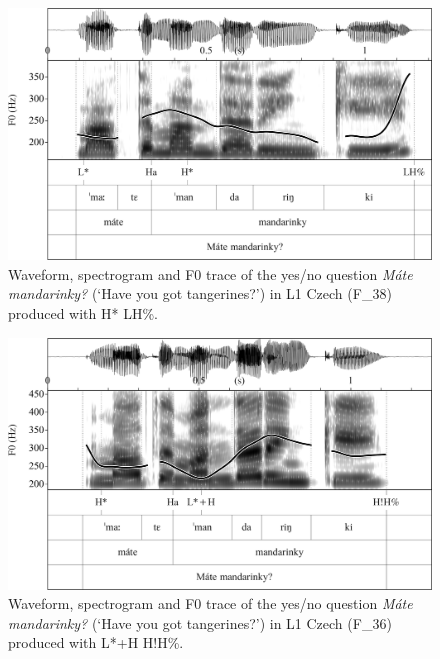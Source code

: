 \vfill
\begin{figure}[H]
\includegraphics[width=\textwidth]{figures/Figure_4.65.png}
\caption{Waveform, spectrogram and F0 trace of the yes/no question \textit{Máte mandarinky?} (‘Have you got tangerines?’) in L1 Czech (F\_38) produced with H* LH\%.}
\label{fig:4.65}
\end{figure}
\vfill\pagebreak

\begin{figure}[H]
\includegraphics[width=\textwidth]{figures/Figure_4.66.png}
\caption{Waveform, spectrogram and F0 trace of the yes/no question \textit{Máte mandarinky?} (‘Have you got tangerines?’) in L1 Czech (F\_36) produced with L*+H H!H\%.}
\label{fig:4.66}
\end{figure}

